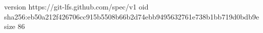 version https://git-lfs.github.com/spec/v1
oid sha256:eb50a212f426706cc915b5508b66b2d74ebb9495632761e738b1bb719d0bdb9e
size 86
